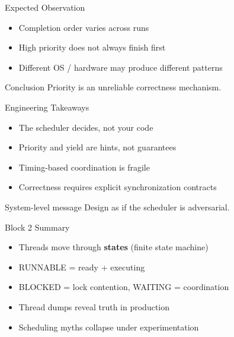 \documentclass[aspectratio=169,11pt]{beamer}
\begin{document}
	\begin{frame}{Expected Observation}
		\begin{itemize}
			\item Completion order varies across runs
			\item High priority does not always finish first
			\item Different OS / hardware may produce different patterns
		\end{itemize}
		
		\vspace{3mm}
		\begin{block}{Conclusion}
			Priority is an unreliable correctness mechanism.
		\end{block}
	\end{frame}
	
	\begin{frame}{Engineering Takeaways}
		\begin{itemize}
			\item The scheduler decides, not your code
			\item Priority and yield are hints, not guarantees
			\item Timing-based coordination is fragile
			\item Correctness requires explicit synchronization contracts
		\end{itemize}
		
		\vspace{3mm}
		\begin{block}{System-level message}
			Design as if the scheduler is adversarial.
		\end{block}
	\end{frame}
	
	\begin{frame}{Block 2 Summary}
		\begin{itemize}
			\item Threads move through \textbf{states} (finite state machine)
			\item RUNNABLE = ready + executing
			\item BLOCKED = lock contention, WAITING = coordination
			\item Thread dumps reveal truth in production
			\item Scheduling myths collapse under experimentation
		\end{itemize}
	\end{frame}
	
\end{document}
